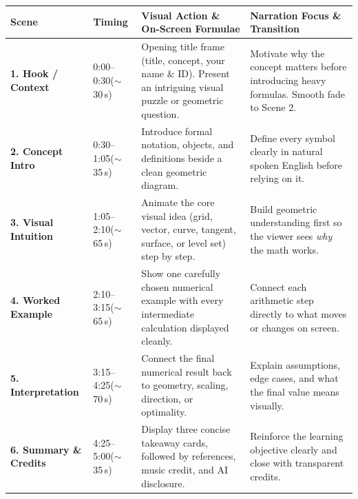 \documentclass[10pt,a4paper]{article}
\begin{document}
\small
\begin{tabularx}{\textwidth}{@{}p{2.0cm} p{1.45cm} X X@{}}
\toprule
\rowcolor{slate}
{\color{white}\textbf{Scene}} & {\color{white}\textbf{Timing}} & {\color{white}\textbf{Visual Action \& On-Screen Formulae}} & {\color{white}\textbf{Narration Focus \& Transition}} \\
\midrule

\textbf{1. Hook / Context} &
0:00--0:30\newline ($\sim$30\,s) &
Opening title frame (title, concept, your name \& ID). Present an intriguing visual puzzle or geometric question. &
Motivate why the concept matters before introducing heavy formulas. Smooth fade to Scene 2. \\
\midrule

\rowcolor{rowtint}
\textbf{2. Concept Intro} &
0:30--1:05\newline ($\sim$35\,s) &
Introduce formal notation, objects, and definitions beside a clean geometric diagram. &
Define every symbol clearly in natural spoken English before relying on it. \\
\midrule

\textbf{3. Visual Intuition} &
1:05--2:10\newline ($\sim$65\,s) &
Animate the core visual idea (grid, vector, curve, tangent, surface, or level set) step by step. &
Build geometric understanding first so the viewer sees \textit{why} the math works. \\
\midrule

\rowcolor{rowtint}
\textbf{4. Worked Example} &
2:10--3:15\newline ($\sim$65\,s) &
Show one carefully chosen numerical example with every intermediate calculation displayed cleanly. &
Connect each arithmetic step directly to what moves or changes on screen. \\
\midrule

\textbf{5. Interpretation} &
3:15--4:25\newline ($\sim$70\,s) &
Connect the final numerical result back to geometry, scaling, direction, or optimality. &
Explain assumptions, edge cases, and what the final value means visually. \\
\midrule

\rowcolor{rowtint}
\textbf{6. Summary \& Credits} &
4:25--5:00\newline ($\sim$35\,s) &
Display three concise takeaway cards, followed by references, music credit, and AI disclosure. &
Reinforce the learning objective clearly and close with transparent credits. \\
\bottomrule
\end{tabularx}
\end{document}
